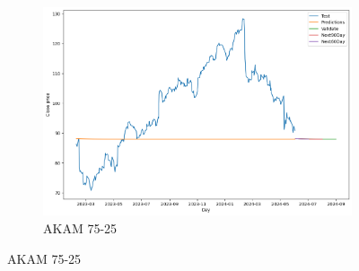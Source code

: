 \documentclass{ieeeojies}
\begin{document}
\begin{figure}[H]
\begin{subfigure}[h]{0.33\linewidth}
        \includegraphics[width=\linewidth]{ARIMA Plot/ARIMA_AKAM_75_25.png}
        \caption{AKAM 75-25}
        \label{fig:akam-75-25}
    \end{subfigure}
\end{figure}
 \vspace{-20pt}
\end{document}
